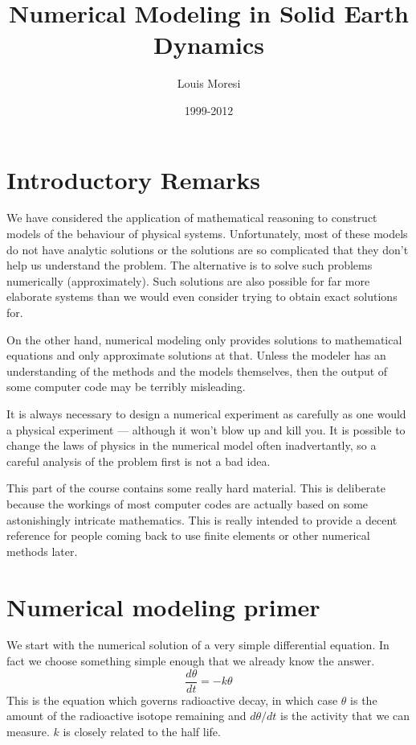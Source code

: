 \documentclass[10pt]{article}
\begin{document}
\title{Numerical Modeling in Solid Earth Dynamics }
\author{Louis Moresi} 
\date{1999-2012}
\maketitle

\section{Introductory Remarks}

	We have considered the application of mathematical reasoning to 
	construct models of the behaviour of physical systems. Unfortunately, most
	of these models do not have analytic solutions or the solutions are so complicated
	that they don't help us understand the problem. The alternative is to solve
	such problems numerically (approximately). Such solutions are also
	possible for far more elaborate systems than we would even consider
	trying to obtain exact solutions for.
	
	On the other hand, numerical modeling only provides solutions to mathematical
	equations and only approximate solutions at that. Unless the modeler has an 
	understanding of the methods and the models themselves, then the output
	of some computer code may be terribly misleading.

	It is always necessary to design a numerical experiment as carefully as
	one would a physical experiment --- although it won't blow up and kill you. 
	It is possible to change the laws of physics in the numerical model often
	inadvertantly, so a careful analysis of the problem first is not a bad idea.
	
	This part of the course contains some really hard material. This is deliberate
	because the workings of most computer codes are actually based on some
	astonishingly intricate mathematics.
	This is really intended to provide a decent reference for people coming back to 
	use finite elements or other numerical methods later. 


\section{Numerical modeling primer}

	We start with the numerical solution of a very simple differential
	equation. In fact we choose something simple enough that we already 
	know the answer.
		\begin{equation}
			\frac{d\theta}{dt} = - k \theta
			\label{eq:ode_decay}
		\end{equation}	
	This is the equation which governs radioactive decay, in which case
	$\theta$ is the amount of the radioactive isotope remaining and $d\theta /  dt$
	is the activity that we can measure. $k$ is closely related to the half life.
	
\end{document}
